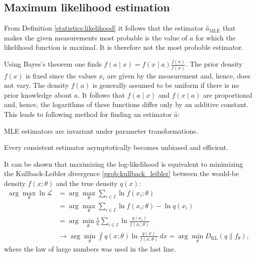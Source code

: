 \subsection{Maximum likelihood estimation}

    From Definition \ref{statistics:likelihood} it follows that the estimator $\hat{a}_\mathrm{MLE}$ that makes the given measurements most probable is the value of $a$ for which the likelihood function is maximal. It is therefore not the most probable estimator.

    Using Bayes's theorem one finds $f(a\mid x) = f(x\mid a)\frac{f(a)}{f(x)}$. The prior density $f(x)$ is fixed since the values $x_i$ are given by the measurement and, hence, does not vary. The density $f(a)$ is generally assumed to be uniform if there is no prior knowledge about $a$. It follows that $f(a\mid x)$ and $f(x\mid a)$ are proportional and, hence, the logarithms of these functions differ only by an additive constant. This leads to following method for finding an estimator $\hat{a}$:
    \begin{property}
        MLE estimators are invariant under parameter transformations.
    \end{property}

    \begin{property}
        Every consistent estimator asymptotically becomes unbiased and efficient.
    \end{property}

    \begin{property}\label{statistics:minimizing_KL}
        It can be shown that maximizing the log-likelihood is equivalent to minimizing the Kullback-Leibler divergence \ref{prob:kullback_leibler} between the would-be density $f(x;\theta)$ and the true density $q(x)$:
        \begin{align*}
            \arg\max_\theta\ln\mathcal{L} &= \arg\max_\theta\sum_{i\in I}\ln f(x_i;\theta)\\
            &= \arg\max_\theta\sum_{i\in I}\ln f(x_i;\theta) - \ln q(x_i)\\
            &= \arg\min_\theta\frac{1}{n}\sum_{i\in I}\ln\frac{q(x_i)}{f(x_i;\theta)}\\
            &\longrightarrow\arg\min_\theta\int q(x;\theta)\ln\frac{q(x)}{f(x;\theta)}\,dx = \arg\min_\theta D_\mathrm{KL}(q\|f_\theta),
        \end{align*}
        where the law of large numbers was used in the last line.
    \end{property}


